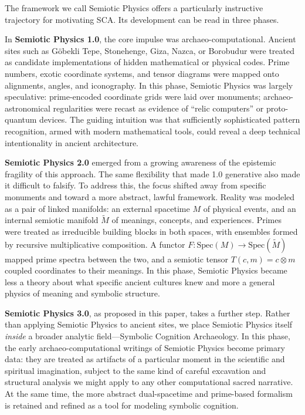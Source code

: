 \documentclass[12]{amsart}
\theoremstyle{plain}
\begin{document}
The framework we call Semiotic Physics offers a particularly instructive trajectory for motivating SCA. Its development can be read in three phases.

In \textbf{Semiotic Physics 1.0}, the core impulse was archaeo-computational. Ancient sites such as Göbekli Tepe, Stonehenge, Giza, Nazca, or Borobudur were treated as candidate implementations of hidden mathematical or physical codes. Prime numbers, exotic coordinate systems, and tensor diagrams were mapped onto alignments, angles, and iconography. In this phase, Semiotic Physics was largely speculative: prime-encoded coordinate grids were laid over monuments; archaeo-astronomical regularities were recast as evidence of ``relic computers'' or proto-quantum devices. The guiding intuition was that sufficiently sophisticated pattern recognition, armed with modern mathematical tools, could reveal a deep technical intentionality in ancient architecture.

\textbf{Semiotic Physics 2.0} emerged from a growing awareness of the epistemic fragility of this approach. The same flexibility that made 1.0 generative also made it difficult to falsify. To address this, the focus shifted away from specific monuments and toward a more abstract, lawful framework. Reality was modeled as a pair of linked manifolds: an external spacetime $M$ of physical events, and an internal semiotic manifold $\tilde M$ of meanings, concepts, and experiences. Primes were treated as irreducible building blocks in both spaces, with ensembles formed by recursive multiplicative composition. A functor $F:\mathrm{Spec}(M)\to\mathrm{Spec}(\tilde M)$ mapped prime spectra between the two, and a semiotic tensor $T(c,m)=c\otimes m$ coupled coordinates to their meanings. In this phase, Semiotic Physics became less a theory about what specific ancient cultures knew and more a general physics of meaning and symbolic structure.

\textbf{Semiotic Physics 3.0}, as proposed in this paper, takes a further step. Rather than applying Semiotic Physics to ancient sites, we place Semiotic Physics itself \emph{inside} a broader analytic field---Symbolic Cognition Archaeology. In this phase, the early archaeo-computational writings of Semiotic Physics become primary data: they are treated as artifacts of a particular moment in the scientific and spiritual imagination, subject to the same kind of careful excavation and structural analysis we might apply to any other computational sacred narrative. At the same time, the more abstract dual-spacetime and prime-based formalism is retained and refined as a tool for modeling symbolic cognition.
\end{document}
